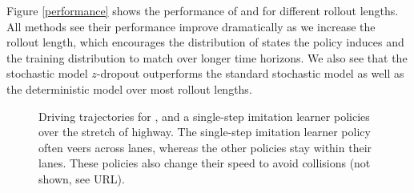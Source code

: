 \documentclass{article} %
\begin{document}
Figure \ref{performance} shows the performance of \modelnamedrop and \modelnameil for different rollout lengths.
All methods see their performance improve dramatically as we increase the rollout length, which encourages the distribution of states the policy induces and the training distribution to match over longer time horizons. We also see that the stochastic model $z$-dropout outperforms the standard stochastic model as well as the deterministic model over most rollout lengths. 







\begin{figure}[t!]
    \centering
    \caption{Driving trajectories for \modelnamedrop, \modelnameil and a single-step imitation learner policies over the stretch of highway. The single-step imitation learner policy often veers across lanes, whereas the other policies stay within their lanes. These policies also change their speed to avoid collisions (not shown, see URL).}
    \label{trajectories}
\end{figure}
\end{document}
